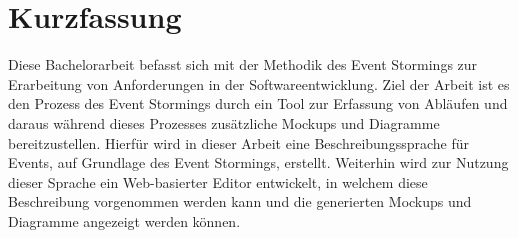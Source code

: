 \chapter*{Kurzfassung}

Diese Bachelorarbeit befasst sich mit der Methodik des Event Stormings zur Erarbeitung von Anforderungen in der Softwareentwicklung.
Ziel der Arbeit ist es den Prozess des Event Stormings durch ein Tool zur Erfassung von Abläufen und daraus während dieses Prozesses
zusätzliche Mockups und Diagramme bereitzustellen.
Hierfür wird in dieser Arbeit eine Beschreibungssprache für Events, auf Grundlage des Event Stormings, erstellt.
Weiterhin wird zur Nutzung dieser Sprache ein Web-basierter Editor entwickelt, in welchem diese Beschreibung vorgenommen werden kann und
die generierten Mockups und Diagramme angezeigt werden können.
